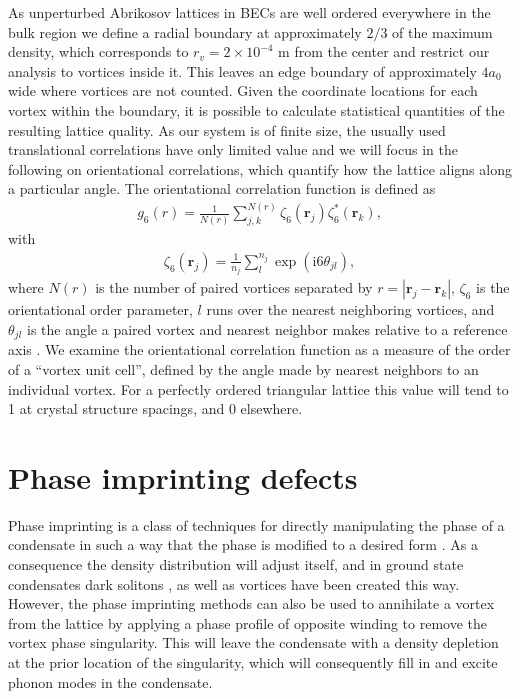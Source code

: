As unperturbed Abrikosov lattices in BECs are well ordered everywhere in the bulk region \cite{Vtx:Anglin_arxiv_2002} we define a radial boundary at approximately $2/3$ of the maximum density, which corresponds to $r_v=2\times 10^{-4}$ m from the center and restrict our analysis to vortices inside it. This leaves an edge boundary of approximately $4a_0$ wide where vortices are not counted. Given the coordinate locations for each vortex within the boundary, it is possible to calculate statistical quantities of the resulting lattice quality. As our system is of finite size, the usually used translational correlations have only limited value and we will focus in the following on orientational correlations, which quantify how the lattice aligns along a particular angle. The orientational correlation function is defined as
\begin{align}
	g_6(r) = \frac{1}{N(r)}\displaystyle\sum\limits_{j,k}^{N(r)}\zeta_6(\mathbf{r}_j)\zeta_6^{*}(\mathbf{r}_k),
\end{align}
with
\begin{align}
	\zeta_6(\mathbf{r}_{j}) =  \frac{1}{n_j}\displaystyle\sum\limits_{l}^{n_j}\exp(\mathrm{i}6\theta_{jl}),
\end{align}
where $N(r)$ is the number of paired vortices separated by $r=|\mathbf{r}_j - \mathbf{r}_k|$, $\zeta_6$ is the orientational order parameter, $l$ runs over the nearest neighboring vortices, and $\theta_{jl}$ is the angle a paired vortex and nearest neighbor makes relative to a reference axis \cite{Guillamon_nat_2014}. We examine the orientational correlation function as a measure of the order of a ``vortex unit cell'', defined by the angle made by nearest neighbors to an individual vortex. For a perfectly ordered triangular lattice this value will tend to 1 at crystal structure spacings, and 0 elsewhere.

\section{Phase imprinting defects}\label{sec:phase}

Phase imprinting is a class of techniques for directly manipulating the phase of a condensate in such a way that the phase is modified to a desired form \cite{Vtx:Dobrek_pra_1999}. As a consequence the density distribution will adjust itself, and in ground state condensates dark solitons \cite{BEC:Denschlag_science_2000}, as well as vortices \cite{Vtx:Leanhardt_prl_2002,VTX:Brachmann_osa_2011} have been created this way. However, the phase imprinting methods can also be used to annihilate a vortex from the lattice by applying a phase profile of opposite winding to remove the vortex phase singularity.  This will leave the condensate with a density depletion at the prior location of the singularity, which will consequently fill in and excite phonon modes in the condensate.

